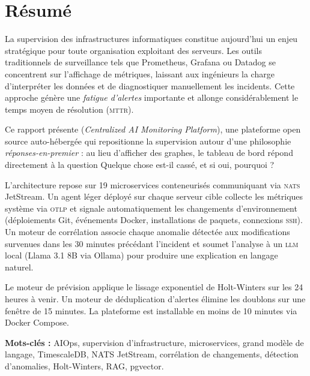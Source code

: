 
\chapter*{Résumé}

\begin{infobox}
La supervision des infrastructures informatiques constitue aujourd'hui un
enjeu stratégique pour toute organisation exploitant des serveurs. Les outils
traditionnels de surveillance tels que Prometheus, Grafana ou Datadog se
concentrent sur l'affichage de métriques, laissant aux ingénieurs la charge
d'interpréter les données et de diagnostiquer manuellement les incidents.
Cette approche génère une \textit{fatigue d'alertes} importante et allonge
considérablement le temps moyen de résolution (\textsc{mttr}).

Ce rapport présente \textbf{\caimp{}} (\textit{Centralized AI Monitoring
Platform}), une plateforme open source auto-hébergée qui repositionne la
supervision autour d'une philosophie \textit{réponses-en-premier} : au lieu
d'afficher des graphes, le tableau de bord répond directement à la question
\og{}Quelque chose est-il cassé, et si oui, pourquoi ?\fg{}

L'architecture repose sur 19 microservices conteneurisés communiquant via
\textsc{nats} JetStream. Un agent léger déployé sur chaque serveur cible
collecte les métriques système via \textsc{otlp} et signale automatiquement
les changements d'environnement (déploiements Git, événements Docker,
installations de paquets, connexions \textsc{ssh}). Un moteur de corrélation
associe chaque anomalie détectée aux modifications survenues dans les 30
minutes précédant l'incident et soumet l'analyse à un \textsc{llm} local
(Llama 3.1 8B via Ollama) pour produire une explication en langage naturel.

Le moteur de prévision applique le lissage exponentiel de Holt-Winters sur
les 24 heures à venir. Un moteur de déduplication d'alertes élimine les
doublons sur une fenêtre de 15 minutes. La plateforme est installable en
moins de 10 minutes via Docker Compose.
\end{infobox}

\medskip
\textbf{Mots-clés :} AIOps, supervision d'infrastructure, microservices,
grand modèle de langage, TimescaleDB, NATS JetStream, corrélation de
changements, détection d'anomalies, Holt-Winters, RAG, pgvector.

